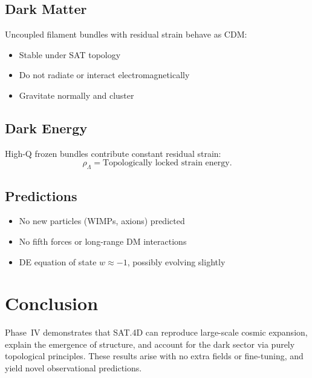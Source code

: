 \documentclass[11pt]{article}
\begin{document}
\subsection{Dark Matter}
Uncoupled filament bundles with residual strain behave as CDM:
\begin{itemize}
  \item Stable under SAT topology
  \item Do not radiate or interact electromagnetically
  \item Gravitate normally and cluster
\end{itemize}

\subsection{Dark Energy}
High-Q frozen bundles contribute constant residual strain:
\[
\rho_\Lambda = \text{Topologically locked strain energy}.
\]

\subsection{Predictions}
\begin{itemize}
  \item No new particles (WIMPs, axions) predicted
  \item No fifth forces or long-range DM interactions
  \item DE equation of state \( w \approx -1 \), possibly evolving slightly
\end{itemize}

\section{Conclusion}
Phase~IV demonstrates that SAT.4D can reproduce large-scale cosmic expansion, 
explain the emergence of structure, and account for the dark sector via purely topological
principles. These results arise with no extra fields or fine-tuning, and yield novel observational predictions.
\end{document}
